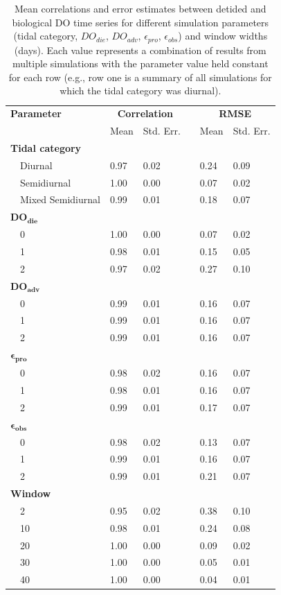 \documentclass[letterpaper,12pt,oneside]{article}\usepackage[]{graphicx}\usepackage[]{color}
\begin{document}
%
\begin{table}[!tbp]
\caption{Mean correlations and error estimates between detided and biological \ac{DO} time series for different simulation parameters (tidal category, $DO_{die}$, $DO_{adv}$, $\epsilon_{pro}$, $\epsilon_{obs}$) and window widths (days).  Each value represents a combination of results from multiple simulations with the parameter value held constant for each row (e.g., row one is a summary of all simulations for which the tidal category was diurnal).\label{tab:dtd_perf}} 
\begin{center}
\begin{tabular}{lllcll}
\hline\hline
\multicolumn{1}{l}{\bfseries Parameter}&\multicolumn{2}{c}{\bfseries Correlation}&\multicolumn{1}{c}{\bfseries }&\multicolumn{2}{c}{\bfseries RMSE}\tabularnewline
\cline{2-3} \cline{5-6}
\multicolumn{1}{l}{}&\multicolumn{1}{c}{Mean}&\multicolumn{1}{c}{Std. Err.}&\multicolumn{1}{c}{}&\multicolumn{1}{c}{Mean}&\multicolumn{1}{c}{Std. Err.}\tabularnewline
\hline
{\bfseries Tidal category}&&&&&\tabularnewline
~~Diurnal&0.97&0.02&&0.24&0.09\tabularnewline
~~Semidiurnal&1.00&0.00&&0.07&0.02\tabularnewline
~~Mixed Semidiurnal&0.99&0.01&&0.18&0.07\tabularnewline
\hline
{\bfseries $\boldsymbol{DO_{die}}$}&&&&&\tabularnewline
~~0&1.00&0.00&&0.07&0.02\tabularnewline
~~1&0.98&0.01&&0.15&0.05\tabularnewline
~~2&0.97&0.02&&0.27&0.10\tabularnewline
\hline
{\bfseries $\boldsymbol{DO_{adv}}$}&&&&&\tabularnewline
~~0&0.99&0.01&&0.16&0.07\tabularnewline
~~1&0.99&0.01&&0.16&0.07\tabularnewline
~~2&0.99&0.01&&0.16&0.07\tabularnewline
\hline
{\bfseries $\boldsymbol{\epsilon_{pro}}$}&&&&&\tabularnewline
~~0&0.98&0.02&&0.16&0.07\tabularnewline
~~1&0.98&0.01&&0.16&0.07\tabularnewline
~~2&0.99&0.01&&0.17&0.07\tabularnewline
\hline
{\bfseries $\boldsymbol{\epsilon_{obs}}$}&&&&&\tabularnewline
~~0&0.98&0.02&&0.13&0.07\tabularnewline
~~1&0.99&0.01&&0.16&0.07\tabularnewline
~~2&0.99&0.01&&0.21&0.07\tabularnewline
\hline
{\bfseries Window}&&&&&\tabularnewline
~~2&0.95&0.02&&0.38&0.10\tabularnewline
~~10&0.98&0.01&&0.24&0.08\tabularnewline
~~20&1.00&0.00&&0.09&0.02\tabularnewline
~~30&1.00&0.00&&0.05&0.01\tabularnewline
~~40&1.00&0.00&&0.04&0.01\tabularnewline
\hline
\end{tabular}
\end{center}
\end{table}
\end{document}
